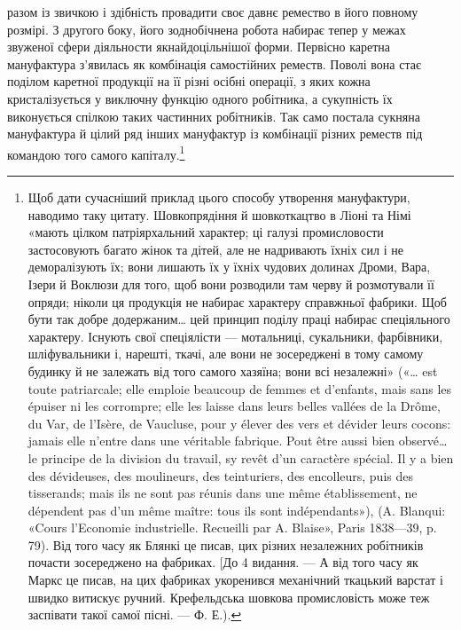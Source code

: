 \parcont{}  %
разом із звичкою і здібність провадити своє давнє ремество в
його повному розмірі. З другого боку, його зоднобічнена робота
набирає тепер у межах звуженої сфери діяльности якнайдоцільнішої
форми. Первісно каретна мануфактура з’явилась як комбінація
самостійних реместв. Поволі вона стає поділом каретної
продукції на її різні осібні операції, з яких кожна кристалізується
у виключну функцію одного робітника, а сукупність їх
виконується спілкою таких частинних робітників. Так само
постала сукняна мануфактура й цілий ряд інших мануфактур
із комбінації різних реместв під командою того самого капіталу.\footnote{
Щоб дати сучасніший приклад цього способу утворення мануфактури,
наводимо таку цитату. Шовкопрядіння й шовкоткацтво в
Ліоні та Німі «мають цілком патріярхальний характер; ці галузі промисловости
застосовують багато жінок та дітей, але не надривають їхніх
сил і не деморалізують їх; вони лишають їх у їхніх чудових долинах Дроми,
Вара, Ізери й Воклюзи для того, щоб вони розводили там черву й розмотували
її опряди; ніколи ця продукція не набирає характеру справжньої
фабрики. Щоб бути так добре додержаним\dots{} цей принцип поділу праці
набирає спеціяльного характеру. Існують свої спеціялісти — мотальниці,
сукальники, фарбівники, шліфувальники і, нарешті, ткачі, але вони не
зосереджені в тому самому будинку й не залежать від того самого хазяїна;
вони всі незалежні» («\dots{} est toute patriarcale; elle emploie beaucoup de
femmes et d’enfants, mais sans les épuiser ni les corrompre; elle les laisse
dans leurs belles vallées de la Drôme, du Var, de l’Isère, de Vaucluse, pour
y élever des vers et dévider leurs cocons: jamais elle n’entre dans une véritable
fabrique. Pout être aussi bien observé\dots{} le principe de la division
du travail, sy revêt d’un caractère spécial. Il y a bien des dévideuses, des
moulineurs, des teinturiers, des encolleurs, puis des tisserands; mais ils
ne sont pas réunis dans une même établissement, ne dépendent pas d’un
même maître: tous ils sont indépendants»), (A. Blanqui: «Cours l'Economie
industrielle. Recueilli par A. Blaise», Paris 1838—39, p. 79).
Від того часу як Блянкі це писав, цих різних незалежних робітників
почасти зосереджено на фабриках. [До 4 видання. — А від того часу
як Маркс це писав, на цих фабриках укоренився механічний ткацький
варстат і швидко витискує ручний. Крефельдська шовкова промисловість
може теж заспівати такої самої пісні. — Ф. Е.).
}

